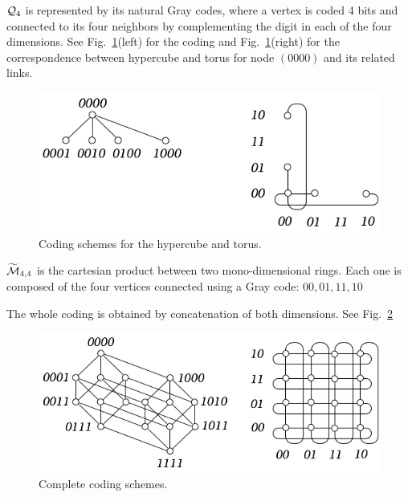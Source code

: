\begin{itemize}
$\mbox{$\cal Q$}_4$ is represented by its natural Gray codes,
where a vertex is coded 4 bits and connected to its four neighbors by complementing 
the digit in each of the four dimensions.
See Fig.~\ref{fig:IsomorphismCodingPrinciple}(left) for the coding and Fig.~\ref{fig:IsomorphismCodingPrinciple}(right)
for the correspondence between hypercube and torus for node $(0000)$ and its related links.
\medskip
 \begin{figure}[hbt]
\begin{center}
       \includegraphics[scale=0.4]{FiguresGraph/IsomorphismEx2}
       \caption{Coding schemes for the hypercube and torus.}
  \label{fig:IsomorphismCodingPrinciple}
\end{center}
\end{figure}

$\widetilde{\mbox{$\cal M$}}_{4,4}$ is the cartesian product between two mono-dimensional rings.
Each one is composed of the four vertices connected using a Gray code:
$00, 01, 11, 10$

The whole coding is obtained by concatenation of both dimensions.
See Fig.~\ref{fig:IsomorphismCodingComplete}
 \begin{figure}[hbt]
\begin{center}
       \includegraphics[scale=0.4]{FiguresGraph/IsomorphismEx1}
       \caption{Complete coding schemes.}
  \label{fig:IsomorphismCodingComplete}
\end{center}
\end{figure}


\end{itemize}
